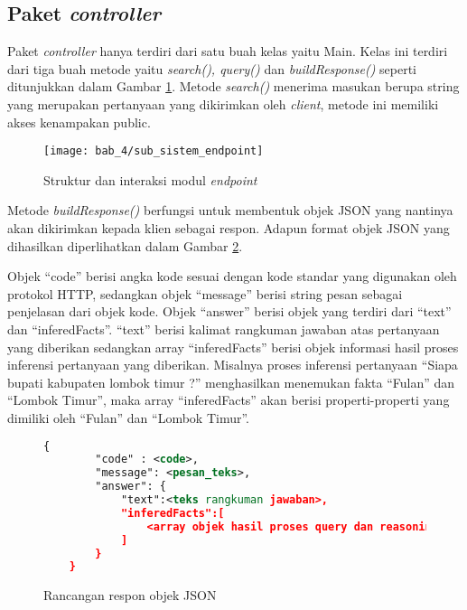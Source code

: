 \subsection{Paket \emph{controller}}
Paket \emph{controller} hanya terdiri dari satu buah kelas yaitu Main. Kelas ini terdiri dari tiga buah metode yaitu \emph{search(), query()} dan \emph{buildResponse()} seperti ditunjukkan dalam Gambar \ref{fig:sub_sistem_endpoint}. Metode \emph{search()} menerima masukan berupa string yang merupakan pertanyaan yang dikirimkan oleh \emph{client}, metode ini memiliki akses kenampakan public.

\begin{figure}[hb]
    \centering
    \texttt{[image: bab\_4/sub\_sistem\_endpoint]}
    \caption{Struktur dan interaksi modul \emph{endpoint}} 
    \label{fig:sub_sistem_endpoint}
\end{figure}

Metode \emph{buildResponse()} berfungsi untuk membentuk objek JSON yang nantinya akan dikirimkan kepada klien sebagai respon. Adapun format objek JSON yang dihasilkan diperlihatkan dalam Gambar \ref{fig:json_response_object}.

Objek ``code'' berisi angka kode sesuai dengan kode standar yang digunakan oleh protokol HTTP, sedangkan objek ``message'' berisi string pesan sebagai penjelasan dari objek kode. Objek ``answer'' berisi objek yang terdiri dari ``text'' dan ``inferedFacts''. ``text'' berisi kalimat rangkuman jawaban atas pertanyaan yang diberikan sedangkan array ``inferedFacts'' berisi objek informasi hasil proses inferensi pertanyaan yang diberikan. Misalnya proses inferensi pertanyaan ``Siapa bupati kabupaten lombok timur ?'' menghasilkan menemukan fakta ``Fulan'' dan ``Lombok Timur'', maka array ``inferedFacts'' akan berisi properti-properti yang dimiliki oleh ``Fulan'' dan ``Lombok Timur''.

\begin{figure}[ht]
    \centering
    \begin{lstlisting}[language=XML,xleftmargin=0pt]
    {
        "code" : <code>,
        "message": <pesan_teks>,
        "answer": {
            "text":<teks rangkuman jawaban>,
            "inferedFacts":[
                <array objek hasil proses query dan reasoning>
            ]
        }
    }
\end{lstlisting}
    \caption{Rancangan respon objek JSON}
    \label{fig:json_response_object}
\end{figure}

